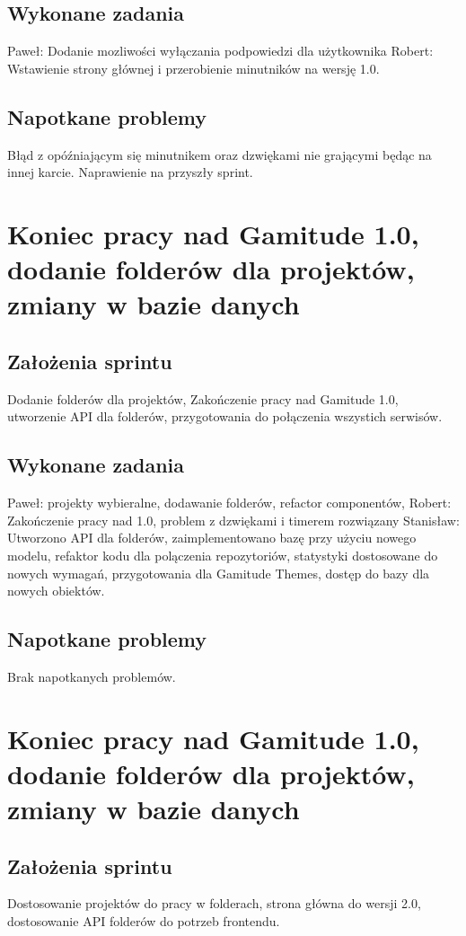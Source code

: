 \documentclass[a4paper,11pt]{report}
\begin{document}
\subsection {Wykonane zadania}
Paweł: Dodanie mozliwości wyłączania podpowiedzi dla użytkownika 
Robert: Wstawienie strony głównej i przerobienie minutników na wersję 1.0. 
\subsection {Napotkane problemy}
Błąd z opóźniającym się minutnikem oraz dzwiękami nie grającymi będąc na innej karcie. Naprawienie na przyszły sprint.

\section {Koniec pracy nad Gamitude 1.0, dodanie folderów dla projektów, zmiany w bazie danych}
\subsection {Założenia sprintu}
Dodanie folderów dla projektów, Zakończenie pracy nad Gamitude 1.0, utworzenie API dla folderów, przygotowania do połączenia wszystich serwisów.
\subsection {Wykonane zadania}
Paweł: projekty wybieralne, dodawanie folderów, refactor componentów, 
Robert: Zakończenie pracy nad 1.0, problem z dzwiękami i timerem rozwiązany 
Stanisław: Utworzono API dla folderów, zaimplementowano bazę przy użyciu nowego modelu, refaktor kodu dla polączenia repozytoriów, statystyki dostosowane do nowych wymagań, przygotowania dla Gamitude Themes, dostęp do bazy dla nowych obiektów. 
\subsection {Napotkane problemy}
Brak napotkanych problemów.

\section {Koniec pracy nad Gamitude 1.0, dodanie folderów dla projektów, zmiany w bazie danych}
\subsection {Założenia sprintu}
Dostosowanie projektów do pracy w folderach, strona główna do wersji 2.0, dostosowanie API folderów do potrzeb frontendu.
\end{document}
